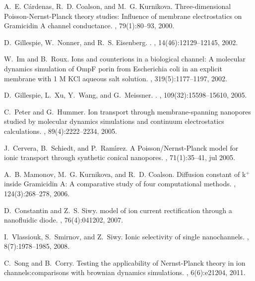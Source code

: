 \documentclass[fleqn,10pt]{SelfArx} %
\begin{document}
\begin{thebibliography}{10}
A.~E. C\'{a}rdenas, R.~D. Coalson, and M.~G. Kurnikova.
\newblock Three-dimensional {Poisson-Nernst-Planck} theory studies: Influence
  of membrane electrostatics on {Gramicidin A} channel conductance.
, 79(1):80--93, 2000.

D.~Gillespie, W.~Nonner, and R.~S. Eisenberg.
.
, 14(46):12129--12145, 2002.

W.~Im and B.~Roux.
\newblock Ions and counterions in a biological channel: {A} molecular dynamics
  simulation of {OmpF} porin from {Escherichia} coli in an explicit membrane
  with 1 {M} {KCl} aqueous salt solution.
, 319(5):1177--1197, 2002.

D.~Gillespie, L.~Xu, Y.~Wang, and G.~Meissner.
.
, 109(32):15598--15610, 2005.

C.~Peter and G.~Hummer.
\newblock Ion transport through membrane-spanning nanopores studied by
  molecular dynamics simulations and continuum electrostatics calculations.
, 89(4):2222--2234, 2005.

J.~Cervera, B.~Schiedt, and P.~Ram{\'{\i}}rez.
\newblock A {Poisson/Nernst-Planck} model for ionic transport through synthetic
  conical nanopores.
, 71(1):35--41, jul 2005.

A.~B. Mamonov, M.~G. Kurnikova, and R.~D. Coalson.
\newblock Diffusion constant of k$^+$ inside {Gramicidin A}: {A} comparative
  study of four computational methods.
, 124(3):268--278, 2006.

D.~Constantin and Z.~S. Siwy.
 model of ion current rectification through a
  nanofluidic diode.
, 76(4):041202, 2007.

I.~Vlassiouk, S.~Smirnov, and Z.~Siwy.
\newblock Ionic selectivity of single nanochannels.
, 8(7):1978--1985, 2008.

C.~Song and B.~Corry.
\newblock Testing the applicability of {Nernst-Planck} theory in ion
  channels:comparisons with brownian dynamics simulations.
, 6(6):e21204, 2011.


\end{thebibliography}
\end{document}
